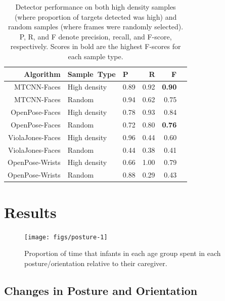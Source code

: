 \documentclass[10pt, letterpaper]{article}
\newenvironment{CodeChunk}{}{}
\begin{document}
\begin{table}[ht]
\centering
\begin{tabular}{rllrrr}
\hline
Algorithm & Sample\ Type & P & R & F \\ 
\hline
MTCNN-Faces & High density & 0.89 & 0.92 & \textbf{0.90} \\ 
MTCNN-Faces & Random & 0.94 & 0.62 & 0.75 \\ 
OpenPose-Faces & High density & 0.78 & 0.93 & 0.84 \\ 
OpenPose-Faces & Random & 0.72 & 0.80 & \textbf{0.76} \\ 
ViolaJones-Faces & High density & 0.96 & 0.44 & 0.60 \\ 
ViolaJones-Faces & Random & 0.44 & 0.38 & 0.41 \\ 
OpenPose-Wrists & High density & 0.66 & 1.00 & 0.79 \\ 
OpenPose-Wrists & Random & 0.88 & 0.29 & 0.43 \\ 
\hline
\end{tabular}
\caption{Detector performance on both high density samples (where proportion of targets detected was high) and random samples (where frames were randomly selected). P, R, and F denote precision, recall, and F-score, respectively. Scores in bold are the highest F-scores for each sample type.} 
\end{table}

\section{Results}\label{results}

\begin{CodeChunk}
\begin{figure}[h]

{\centering \texttt{[image: figs/posture-1]} 

}

\caption[Proportion of time that infants in each age group spent in each posture/orientation relative to their caregiver]{Proportion of time that infants in each age group spent in each posture/orientation relative to their caregiver.}\label{fig:posture}
\end{figure}
\end{CodeChunk}

\subsection{Changes in Posture and
Orientation}\label{changes-in-posture-and-orientation}
\end{document}
